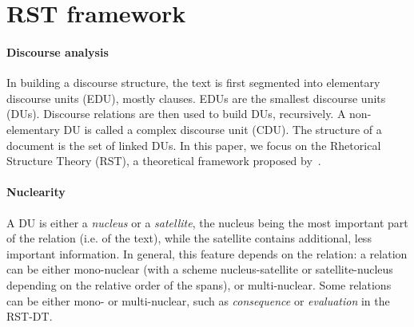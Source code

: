 \documentclass[11pt]{article}
\newcommand{\rel}[1]{\textit{#1}}
\begin{document}
\section{RST framework}
\label{sec:rst}


\paragraph{Discourse analysis}
In building a discourse structure, the text is first segmented into elementary discourse units (EDU), mostly clauses. EDUs are the smallest discourse units (DUs). Discourse relations are then used to build DUs, recursively. A non-elementary DU is called a complex discourse unit (CDU). The structure of a document is the set of linked DUs.
In this paper, we focus on the Rhetorical Structure Theory (RST), a theoretical framework proposed by~.

\paragraph{Nuclearity}
A DU is either a \emph{nucleus} or a \emph{satellite}, the nucleus being the most important part of the relation (i.e. of the text), while the satellite contains additional, less important information. 
In general, this feature depends on the relation: a relation can be either mono-nuclear (with a scheme nucleus-satellite or satellite-nucleus depending on the relative order of the spans), or multi-nuclear.  
Some relations can be either mono- or multi-nuclear, such as \rel{consequence} or \rel{evaluation} in the RST-DT.
\end{document}
